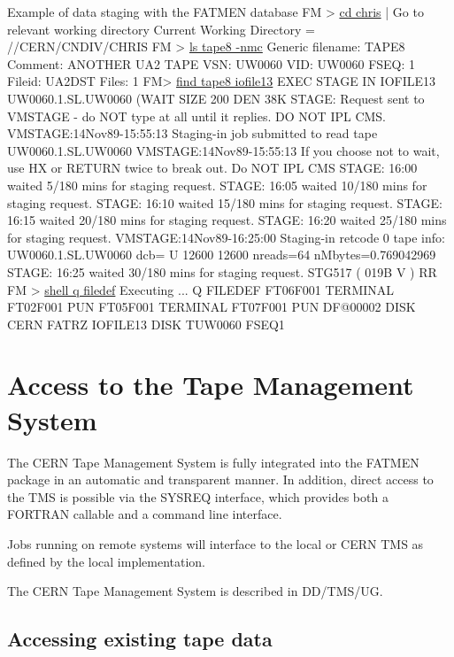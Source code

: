 \begin{XMPt}{Example of data staging with the FATMEN database}
FM > \underline{cd chris}                  | Go to relevant working directory
Current Working Directory = //CERN/CNDIV/CHRIS
FM > \underline{ls tape8 -nmc}
Generic filename: TAPE8
Comment: ANOTHER UA2 TAPE
VSN: UW0060 VID: UW0060 FSEQ:    1
Fileid:      UA2DST
Files:    1
FM> \underline{find tape8 iofile13}
EXEC STAGE IN IOFILE13   UW0060.1.SL.UW0060 (WAIT SIZE 200 DEN 38K
STAGE: Request sent to VMSTAGE - do NOT type at all until it replies. DO NOT
IPL CMS.
VMSTAGE:14Nov89-15:55:13 Staging-in job submitted to read tape
                         UW0060.1.SL.UW0060
VMSTAGE:14Nov89-15:55:13 If you choose not to wait, use HX or RETURN twice to
                         break out. Do NOT IPL CMS
STAGE: 16:00 waited 5/180 mins for staging request.
STAGE: 16:05 waited 10/180 mins for staging request.
STAGE: 16:10 waited 15/180 mins for staging request.
STAGE: 16:15 waited 20/180 mins for staging request.
STAGE: 16:20 waited 25/180 mins for staging request.
VMSTAGE:14Nov89-16:25:00 Staging-in retcode 0 tape info: UW0060.1.SL.UW0060
                         dcb= U 12600 12600 nreads=64 nMbytes=0.769042969
STAGE: 16:25 waited 30/180 mins for staging request.
STG517 ( 019B  V ) RR
FM > \underline{shell q filedef}
Executing ... Q FILEDEF
FT06F001 TERMINAL
FT02F001 PUN
FT05F001 TERMINAL
FT07F001 PUN
DF@00002 DISK     CERN     FATRZ
IOFILE13 DISK     TUW0060  FSEQ1
\end{XMPt}

\section{Access to the Tape Management System}

The CERN Tape Management System is fully integrated into the FATMEN
package in an automatic and transparent manner.
In addition, direct access to the
TMS is possible via the SYSREQ interface, which provides both a FORTRAN
callable and a command line interface.

Jobs running on remote systems will interface to the local or CERN TMS
as defined by the local implementation.

The CERN Tape Management System is described in DD/TMS/UG.

\subsection{Accessing existing tape data}

